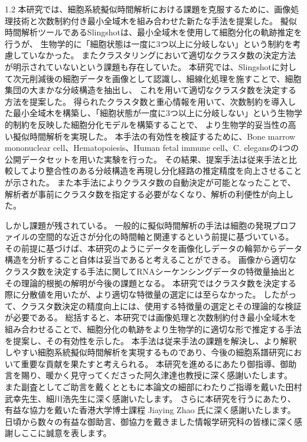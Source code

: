 \documentclass[dvipdfmx,11pt]{kuisthesis}
\begin{document}
\begin{spacing}{1.2}
本研究では、細胞系統擬似時間解析における課題を克服するために、画像処理技術と次数制約付き最小全域木を組み合わせた新たな手法を提案した。
擬似時間解析ツールであるSlingshotは、最小全域木を使用して細胞分化の軌跡推定を行うが、
生物学的に「細胞状態は一度に3つ以上に分岐しない」という制約を考慮していなかった。
またクラスタリングにおいて適切なクラスタ数の決定方法が明示されていないという課題も存在していた。
本研究では、Slingshotに対して次元削減後の細胞データを画像として認識し、細線化処理を施すことで、細胞集団の大まかな分岐構造を抽出し、
これを用いて適切なクラスタ数を決定する方法を提案した。
得られたクラスタ数と重心情報を用いて、次数制約を導入した最小全域木を構築し、「細胞状態が一度に3つ以上に分岐しない」という生物学的制約を反映した細胞分化モデルを構築することで、
より生物学的妥当性の高い擬似時間解析を実現した。
本手法の有効性を検証するために、Bone marrow mononuclear cell、Hematopoiesis、Human fetal immune cell、C. elegansの4つの公開データセットを用いた実験を行った。
その結果、提案手法は従来手法と比較してより整合性のある分岐構造を再現し分化経路の推定精度を向上させることが示された。
また本手法によりクラスタ数の自動決定が可能となったことで、解析者が事前にクラスタ数を指定する必要がなくなり、解析の利便性が向上した。

しかし課題が残されている。
一般的に擬似時間解析の手法は細胞の発現プロファイルの空間的な近さが分化の時間軸と関連するという前提に基づいている。
その前提に基づけば、本研究のようにデータを画像化しデータの輪郭からデータ構造を分析すること自体は妥当であると考えることができる。
画像から適切なクラスタ数を決定する手法に関してRNAシーケンシングデータの特徴量抽出とその理論的根拠の解明が今後の課題となる。
本研究ではクラスタ数を決定する際に分散値を用いたが、より適切な特徴量の選定には至らなかった。
したがって、クラスタ数決定の精度向上には、使用する特徴量の選定とその理論的な検証が必要である。
総括すると、本研究では画像処理と次数制約付き最小全域木を組み合わせることで、細胞分化の軌跡をより生物学的に適切な形で推定する手法を提案し、その有効性を示した。
本手法は従来手法の課題を解決し、より解釈しやすい細胞系統擬似時間解析を実現するものであり、今後の細胞系譜研究において重要な貢献を果たすと考えられる。
\newpage
\acknowledgments				%
本研究を進めるにあたり御指導、御助言を賜り、暖かく見守ってくださった阿久津達也教授に深く感謝いたします。
また副査としてご助言を戴くとともに本論文の細部にわたりご指導を戴いた田村武幸先生、細川浩先生に深く感謝いたします。
さらに本研究を行うにあたり、有益な協力を戴いた香港大学博士課程 Jiaying Zhao 氏に深く感謝いたします。
日頃から数々の有益な御助言、御協力を戴きました情報学研究科の皆様に深く感謝しここに誠意を表します。
\end{spacing}
\nocite{*}
\end{document}

